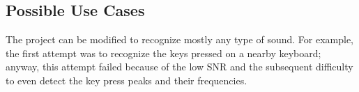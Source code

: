 \documentclass[12pt]{article}
\begin{document}
\subsection{Possible Use Cases}
The project can be modified to recognize mostly any type of sound. For example, the first attempt was to recognize the keys pressed on a nearby keyboard; anyway, this attempt failed because of the low SNR and the subsequent difficulty to even detect the key press peaks and their frequencies.
\end{document}
